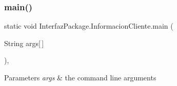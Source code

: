 \subsubsection{\texorpdfstring{main()}{main()}}
{\footnotesize\ttfamily static void Interfaz\+Package.\+Informacion\+Cliente.\+main (\begin{DoxyParamCaption}\item[{String}]{args\mbox{[}$\,$\mbox{]} }\end{DoxyParamCaption})\hspace{0.3cm}{\ttfamily [inline]}, {\ttfamily [static]}}


\begin{DoxyParams}{Parameters}
{\em args} & the command line arguments \\
\hline
\end{DoxyParams}

